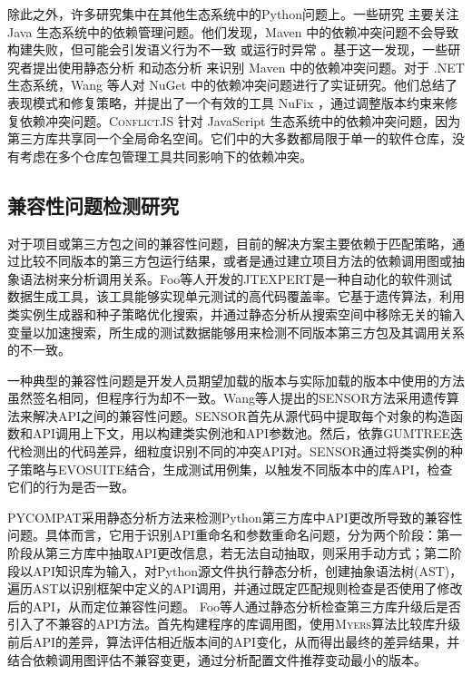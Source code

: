 除此之外，许多研究集中在其他生态系统中的Python问题上。一些研究  主要关注 Java 生态系统中的依赖管理问题。他们发现，Maven 中的依赖冲突问题不会导致构建失败，但可能会引发语义行为不一致  或运行时异常 。基于这一发现，一些研究者提出使用静态分析 和动态分析  来识别 Maven 中的依赖冲突问题。对于 .NET 生态系统，Wang 等人对 NuGet 中的依赖冲突问题进行了实证研究。他们总结了表现模式和修复策略，并提出了一个有效的工具 NuFix ，通过调整版本约束来修复依赖冲突问题。\textsc{ConflictJS} 针对 JavaScript 生态系统中的依赖冲突问题，因为第三方库共享同一个全局命名空间。它们中的大多数都局限于单一的软件仓库，没有考虑在多个仓库包管理工具共同影响下的依赖冲突。
\subsection{兼容性问题检测研究}
对于项目或第三方包之间的兼容性问题，目前的解决方案主要依赖于匹配策略，通过比较不同版本的第三方包运行结果，或者是通过建立项目方法的依赖调用图或抽象语法树来分析调用关系。Foo等人开发的JTEXPERT是一种自动化的软件测试数据生成工具，该工具能够实现单元测试的高代码覆盖率。它基于遗传算法，利用类实例生成器和种子策略优化搜索，并通过静态分析从搜索空间中移除无关的输入变量以加速搜索，所生成的测试数据能够用来检测不同版本第三方包及其调用关系的不一致。

一种典型的兼容性问题是开发人员期望加载的版本与实际加载的版本中使用的方法虽然签名相同，但程序行为却不一致。Wang等人提出的\textsc{SENSOR}方法采用遗传算法来解决API之间的兼容性问题。\textsc{SENSOR}首先从源代码中提取每个对象的构造函数和API调用上下文，用以构建类实例池和API参数池。然后，依靠\textsc{GUMTREE}迭代检测出的代码差异，细粒度识别不同的冲突API对。\textsc{SENSOR}通过将类实例的种子策略与\textsc{EVOSUITE}结合，生成测试用例集，以触发不同版本中的库API，检查它们的行为是否一致。

\textsc{PYCOMPAT}采用静态分析方法来检测Python第三方库中API更改所导致的兼容性问题。具体而言，它用于识别API重命名和参数重命名问题，分为两个阶段：第一阶段从第三方库中抽取API更改信息，若无法自动抽取，则采用手动方式；第二阶段以API知识库为输入，对Python源文件执行静态分析，创建抽象语法树(AST)，遍历AST以识别框架中定义的API调用，并通过既定匹配规则检查是否使用了修改后的API，从而定位兼容性问题。 Foo等人通过静态分析检查第三方库升级后是否引入了不兼容的API方法。首先构建程序的库调用图，使用\textsc{Myers}算法比较库升级前后API的差异，算法评估相近版本间的API变化，从而得出最终的差异结果，并结合依赖调用图评估不兼容变更，通过分析配置文件推荐变动最小的版本。
